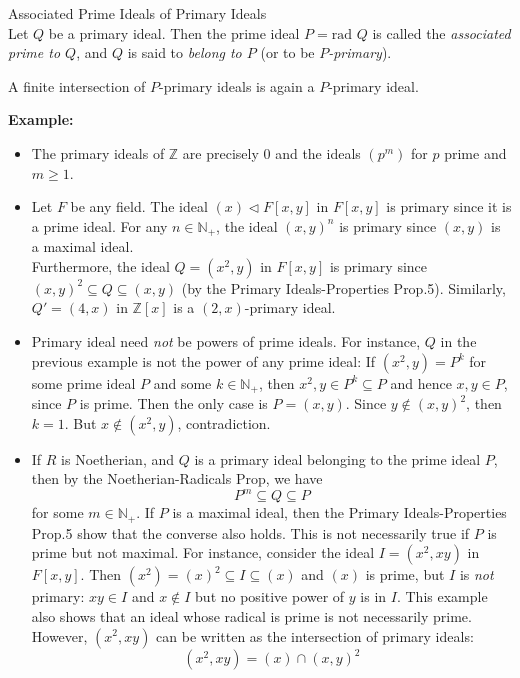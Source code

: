 \begin{definition}{Associated Prime Ideals of Primary Ideals}\\
Let $Q$ be a primary ideal. Then the prime ideal $P= \text{rad }Q$ is called the \textit{associated prime to $Q$}, and $Q$ is said to \textit{belong to $P$} (or to be \textit{$P$-primary}).
\end{definition}

\begin{proposition}
    A finite intersection of $P$-primary ideals is again a $P$-primary ideal.
\end{proposition}

\noindent\textbf{Example:} \begin{itemize}
    \item The primary ideals of $\mathbb{Z}$ are precisely $0$ and the ideals $(p^m)$ for $p$ prime and $m \geq 1$.

    \item Let $F$ be any field. The ideal $(x) \triangleleft F[x,y]$ in $F[x,y]$ is primary since it is a prime ideal. For any $n \in \mathbb{N}_+$, the ideal $(x,y)^n$ is primary since $(x,y)$ is a maximal ideal.\\
    Furthermore, the ideal $Q=(x^2,y)$ in $F[x,y]$ is primary since $(x,y)^2 \subseteq Q \subseteq (x,y)$ (by the Primary Ideals-Properties Prop.5). Similarly, $Q'=(4,x)$ in $\mathbb{Z}[x]$ is a $(2,x)$-primary ideal. 

    \item Primary ideal need \textit{not} be powers of prime ideals. For instance, $Q$ in the previous example is not the power of any prime ideal: If $(x^2,y)=P^k$ for some prime ideal $P$ and some $k\in \mathbb{N}_+$, then $x^2,y\in P^k\subseteq P$ and hence $x,y \in P$, since $P$ is prime. Then the only case is $P=(x,y)$. Since $y \notin (x,y)^2$, then $k=1$. But $x \notin (x^2,y)$, contradiction.

    \item If $R$ is Noetherian, and $Q$ is a primary ideal belonging to the prime ideal $P$, then by the Noetherian-Radicals Prop, we have
    $$P^m \subseteq Q \subseteq P$$
    for some $m \in \mathbb{N}_+$. If $P$ is a maximal ideal, then the Primary Ideals-Properties Prop.5 show that the converse also holds. This is not necessarily true if $P$ is prime but not maximal. For instance, consider the ideal $I= (x^2,xy)$ in $F[x,y]$. Then $(x^2)= (x)^2 \subseteq I \subseteq (x)$ and $(x)$ is prime, but $I$ is \textit{not} primary: $xy \in I$ and $x\notin I$ but no positive power of $y$ is in $I$. This example also shows that an ideal whose radical is prime is not necessarily prime. However, $(x^2,xy)$ can be written as the intersection of primary ideals:
    $$(x^2,xy) = (x) \cap (x,y)^2$$
\end{itemize}



